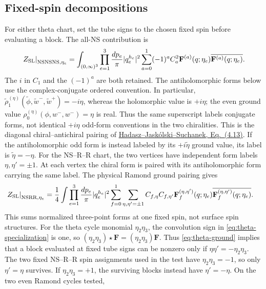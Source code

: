 \subsection{Fixed-spin decompositions}

For either theta chart, set the tube signs to the chosen fixed spin
before evaluating a block. The all-NS contribution is
\begin{equation}
 \left.Z_{\mathrm{SL}}\right|_{\mathrm{NS}\mathrm{NS}\mathrm{NS},\eta_e}
 =\int_{(0,\infty)^3}\prod_{e=1}^3\frac{dp_e}{\pi}|q_e^{h_e}|^2
 \sum_{a=0}^1(-1)^a C_a^2
 \mathbf F^{(a)}(q;\eta_e)\overline{\mathbf F^{(a)}(q;\eta_e)}.
 \label{eq:partition-allns}
\end{equation}
The $i$ in $C_1$ and the $(-1)^a$ are both retained.
The antiholomorphic forms below use the complex-conjugate ordered
convention. In particular,
$\widetilde\rho_1^{(\eta)}(\widetilde\phi,\widetilde w^-,
\widetilde w^+)=-i\eta$, whereas the holomorphic value is $+i\eta$;
the even ground value $\rho_0^{(\eta)}(\phi,w^-,w^-)=\eta$ is real.
Thus the same superscript labels conjugate forms, not identical
$+i\eta$ odd-form conventions in the two chiralities. This is the
diagonal chiral--antichiral pairing of
\href{https://arxiv.org/pdf/0810.1203}{Hadasz--Jask\'olski--Suchanek,
Eq.~(4.13)}. If the antiholomorphic odd form is instead labeled by
its $+i\widetilde\eta$ ground value, its label is
$\widetilde\eta=-\eta$.
For the NS--R--R chart, the two vertices have independent form labels
$\eta,\eta'=\pm1$. At each vertex the chiral form is paired with its
antiholomorphic form carrying the same label. The physical Ramond
ground pairing gives
\begin{align}
 \left.Z_{\mathrm{SL}}\right|_{\mathrm{NS}\mathrm R\mathrm R,\eta_e}
 ={}&\frac14\int\prod_{e=1}^3\frac{dp_e}{\pi}|q_e^{h_e}|^2
 \sum_{f=0}^1\sum_{\eta,\eta'=\pm1}C_{f,\eta}C_{f,\eta'}
 \mathbf F_f^{(\eta,\eta')}(q;\eta_e)
 \overline{\mathbf F_f^{(\eta,\eta')}(q;\eta_e)}.
 \label{eq:partition-nsrr-full}
\end{align}
This sums normalized three-point forms at one fixed spin, not
surface spin structures. For the theta cycle monomial $\eta_2\eta_3$,
the convolution sign in \eqref{eq:theta-specialization} is one, so
$(\eta_2\eta_3)\star\mathbf F=(\eta_2\eta_3)\mathbf F$.
Thus \eqref{eq:theta-ground} implies that a block evaluated at fixed
tube signs can be nonzero only if $\eta\eta'=-\eta_2\eta_3$.
The two fixed NS--R--R spin assignments used in the test have
$\eta_2\eta_3=-1$, so only $\eta'=\eta$ survives. If
$\eta_2\eta_3=+1$, the surviving blocks instead have
$\eta'=-\eta$. On the two even Ramond cycles tested,

